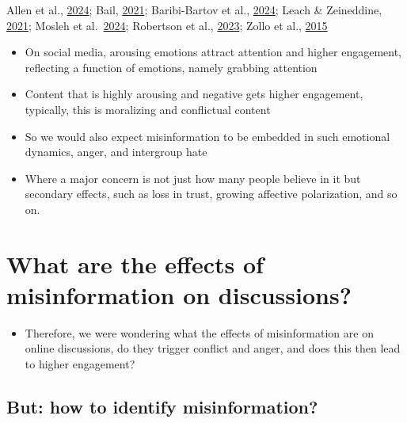 \documentclass[
  letterpaper,
  DIV=11,
  numbers=noendperiod]{scrartcl}
\providecommand{\tightlist}{%
  \setlength{\itemsep}{0pt}\setlength{\parskip}{0pt}}\usepackage{longtable,booktabs,array}
\begin{document}
Allen et al.,
\href{https://www.science.org/doi/full/10.1126/science.adk3451}{2024};
Bail,
\href{https://press.princeton.edu/books/hardcover/9780691203423/breaking-the-social-media-prism}{2021};
Baribi-Bartov et al.,
\href{https://www.science.org/doi/10.1126/science.adl4435}{2024}; Leach
\& Zeineddine,
\href{https://link.springer.com/10.1007/s42761-021-00051-z}{2021};
Mosleh et al.~\href{https://doi.org/10.1093/pnasnexus/pgae111}{2024};
Robertson et al.,
\href{https://www.nature.com/articles/s41586-023-06078-5}{2023}; Zollo
et al., \href{https://dx.plos.org/10.1371/journal.pone.0138740}{2015}

\begin{itemize}
\item
  On social media, arousing emotions attract attention and higher
  engagement, reflecting a function of emotions, namely grabbing
  attention
\item
  Content that is highly arousing and negative gets higher engagement,
  typically, this is moralizing and conflictual content
\item
  So we would also expect misinformation to be embedded in such
  emotional dynamics, anger, and intergroup hate
\item
  Where a major concern is not just how many people believe in it but
  secondary effects, such as loss in trust, growing affective
  polarization, and so on.
\end{itemize}

\hypertarget{what-are-the-effects-of-misinformation-on-discussions}{%
\section{What are the effects of misinformation on
discussions?}\label{what-are-the-effects-of-misinformation-on-discussions}}

\begin{itemize}
\tightlist
\item
  Therefore, we were wondering what the effects of misinformation are on
  online discussions, do they trigger conflict and anger, and does this
  then lead to higher engagement?
\end{itemize}

\hypertarget{but-how-to-identify-misinformation}{%
\subsection{But: how to identify
misinformation?}\label{but-how-to-identify-misinformation}}
\end{document}
